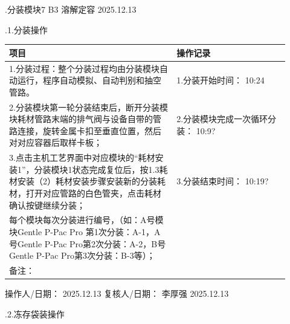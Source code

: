 \documentclass[UTF8,10pt,a4paper,fontset=fandol]{ctexart}
\newcommand{\fieldvalue}[1]{#1}
\newcommand{\handwritten}[1]{#1}
\begin{document}
.\quad 分装模块7\quad
\handwritten{B3}\quad
\handwritten{溶解定容}\quad
\handwritten{2025.12.13}

\medskip
{}.1.\quad 分装操作

\begin{center}
\small
\begin{tabular}{|p{0.55\linewidth}|p{0.37\linewidth}|}
\hline
\centering 项目 & \centering 操作记录\\
\hline
1.分装过程：整个分装过程均由分装模块自动运行，程序自动模拟、自动判别和抽空管路。& 
1.分装开始时间：
\fieldvalue{\handwritten{10:24}}\\[2pt]
2.分装模块第一轮分装结束后，断开分装模块耗材管路末端的排气阀与设备自带的管路连接，旋转金属卡扣至垂直位置，然后对对应容器后取样卡板；&
2.分装模块完成一次循环分装：
\fieldvalue{\handwritten{10:9?}}\\[2pt]
3.点击主机工艺界面中对应模块的“耗材安装1”，分装模块1状态完成复位后，按1.3耗材安装（2）耗材安装步骤安装新的分装耗材，打开对应管路的白色管夹，点击耗材确认按键继续分装；&
3.分装结束时间：
\fieldvalue{\handwritten{10:19?}}\\
\hline
每个模块每次分装进行编号，（如：A号模块Gentle P-Pac Pro 第1次分装：A-1，A号Gentle P-Pac Pro第2次分装：A-2，B号Gentle P-Pac Pro第3次分装：B-3等）；&
\\
\hline
备注：&\\
\hline
\end{tabular}
\end{center}

\noindent
操作人/日期：
\fieldvalue{\handwritten{2025.12.13}}
\hfill
复核人/日期：
\fieldvalue{\handwritten{李厚强}}
\quad
\fieldvalue{\handwritten{2025.12.13}}

\medskip
{}.2.\quad 冻存袋装操作
\end{document}
